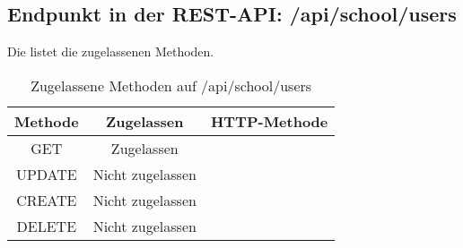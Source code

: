 \subsection{Endpunkt in der REST-API: /api/school/users}
Die  listet die zugelassenen Methoden. 


\begin{table}[!htbp]
	\begin{tabular}{|c|c|c|}
		\hline
			\textbf{Methode} & \textbf{Zugelassen} & \textbf{HTTP-Methode} \\ \hline
			GET & Zugelassen &  \\ \hline
			UPDATE & Nicht zugelassen & \\ \hline 
			CREATE & Nicht zugelassen & \\ \hline 
			DELETE & Nicht zugelassen & \\ \hline
	\end{tabular}

		\caption{Zugelassene Methoden auf /api/school/users}
		\label{tab:end:rest:api:school:users:meth}
\end{table}
